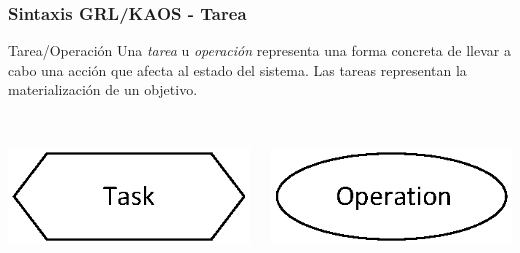\documentclass[handout,slidestop,xcolor=pst,dvips,blue]{beamer}
\begin{document}
\begin{frame}[c]
	\frametitle{Sintaxis GRL/KAOS - Tarea}
	\begin{block}{Tarea/Operación}
		Una \alert{\emph{tarea}} u \alert{\emph{operación}} representa una forma concreta de llevar a cabo una acción que afecta al estado del sistema.
		Las tareas representan la materialización de un objetivo.
		\ \\
		\ \\
		\begin{columns}[c]
			\begin{column}{0.50\linewidth}
				\centering \includegraphics[width=0.5\columnwidth,keepaspectratio=true]{images/objetivos/task(GRL).eps}
			\end{column}
			\begin{column}{0.50\linewidth}
				\centering \includegraphics[width=0.5\columnwidth,keepaspectratio=true]{images/objetivos/operation(KAOS).eps}
			\end{column}
		\end{columns}
	\end{block}
\end{frame}
\end{document}
